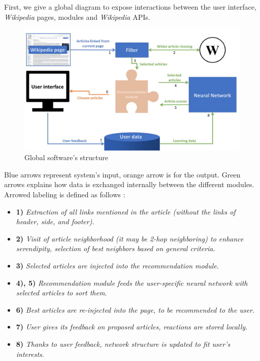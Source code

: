 \documentclass[11pt]{article}
\theoremstyle{plain}
\theoremstyle{definition}
\theoremstyle{remark}
\begin{document}
First, we give a global diagram to expose interactions between the user interface, \textit{Wikipedia} pages, modules and \textit{Wikipedia} APIs. 

\begin{figure}[h!]
	\centering
    \includegraphics[width=400pt]{diagram.png}
    \caption{Global software's structure}
    \label{arch_glo}
\end{figure}

Blue arrows represent system's input, orange arrow is for the output. Green arrows explains how data is exchanged internally between the different modules. Arrowed labeling is defined as follows :
\begin{itemize}
\item \textbf{1)} \textit{Extraction of all links mentioned in the article (without the links of header, side, and footer)}.
\item \textbf{2)} \textit{Visit of article neighborhood (it may be 2-hop neighboring) to enhance serendipity, selection of best neighbors based on general criteria}.
\item \textbf{3)} \textit{Selected articles are injected into the recommendation module}.
\item \textbf{4), 5)} \textit{Recommendation module feeds the user-specific neural network with selected articles to sort them}.
\item \textbf{6)} \textit{Best articles are re-injected into the page, to be recommended to the user}.
\item \textbf{7)} \textit{User gives its feedback on proposed articles, reactions are stored locally}.
\item \textbf{8)} \textit{Thanks to user feedback, network structure is updated to fit user's interests}.
\end{itemize}
\end{document}

